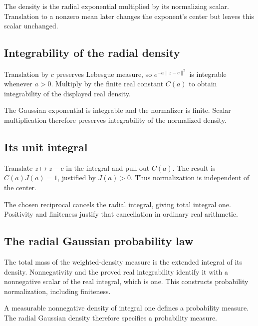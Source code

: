 \documentclass[11pt,a4paper]{report}
\begin{document}
The density is the radial exponential multiplied by its normalizing scalar. Translation to a nonzero mean later changes the exponent's center but leaves this scalar unchanged.

\subsection{\texorpdfstring{Integrability of the radial density}{Integrability of the radial density}}
\label{report-step-UnadjustedLangevin-GaussianProposalDensity-lean-6}


Translation by \(c\) preserves Lebesgue measure, so \(e^{-a\|z-c\|^2}\) is integrable whenever \(a>0\). Multiply by the finite real constant \(C(a)\) to obtain integrability of the displayed real density.



The Gaussian exponential is integrable and the normalizer is finite. Scalar multiplication therefore preserves integrability of the normalized density.

\subsection{\texorpdfstring{Its unit integral}{Its unit integral}}
\label{report-step-UnadjustedLangevin-GaussianProposalDensity-lean-7}


Translate \(z\mapsto z-c\) in the integral and pull out \(C(a)\). The result is \(C(a)J(a)=1\), justified by \(J(a)>0\). Thus normalization is independent of the center.



The chosen reciprocal cancels the radial integral, giving total integral one. Positivity and finiteness justify that cancellation in ordinary real arithmetic.

\subsection{\texorpdfstring{The radial Gaussian probability law}{The radial Gaussian probability law}}
\label{report-step-UnadjustedLangevin-GaussianProposalDensity-lean-8}


The total mass of the weighted-density measure is the extended integral of its density. Nonnegativity and the proved real integrability identify it with a nonnegative scalar of the real integral, which is one. This constructs probability normalization, including finiteness.



A measurable nonnegative density of integral one defines a probability measure. The radial Gaussian density therefore specifies a probability measure.
\end{document}
